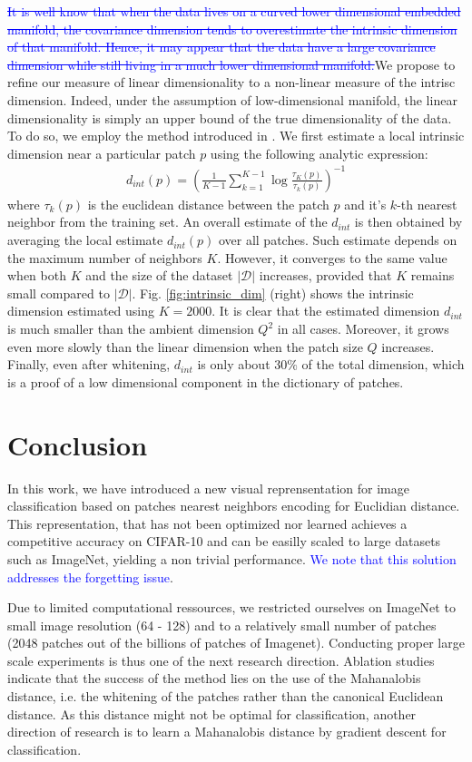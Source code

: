 \documentclass{article}
\newcommand{\Edouard}[1]{\textcolor{blue}{#1}}
\begin{document}
\Edouard{\sout{It is well know that when the data lives on a curved lower dimensional embedded manifold, the covariance dimension tends to overestimate the intrinsic dimension of that manifold. Hence, it may appear that the data have a large covariance dimension while still living in a much lower dimensional manifold.}}We propose to refine our measure of linear dimensionality to a non-linear measure of the intrisc dimension. Indeed, under the assumption of low-dimensional manifold, the linear dimensionality is simply an upper bound of the true dimensionality of the data. To do so, we employ the method introduced in \citep{}. We first estimate a local intrinsic dimension near a particular patch $p$ using the following analytic expression:
\begin{align}
	d_{int}(p) = \left( \frac{1}{K-1} \sum_{k=1}^{K-1}\log \frac{\tau_K(p)}{\tau_k(p)} \right)^{-1} 
\end{align}
where $\tau_k(p)$ is the euclidean distance between the patch $p$ and it's $k$-th nearest neighbor from the training set. 
An overall estimate of the $d_{int}$ is then obtained by averaging the local estimate $d_{int}(p)$ over all patches. Such estimate depends on the maximum number of neighbors $K$. However, it converges to the same value when both $K$ and the size of the dataset $| \mathcal{D}|$ increases, provided that $K$ remains small compared to  $ |\mathcal{D}|$. Fig. \ref{fig:intrinsic_dim} (right) shows the intrinsic dimension estimated using $K=2000$. It is clear that the estimated dimension $d_{int}$ is much smaller than the ambient dimension $Q
^2$ in all cases. Moreover, it grows even more slowly than the linear dimension when the patch size $Q$ increases. Finally, even after whitening, $d_{int}$ is only about $30\%$ of the total dimension, which is a proof of a low dimensional component in the dictionary of patches.   
\section{Conclusion}

In this work, we have introduced a new visual reprensentation for image classification based on patches nearest neighbors encoding for Euclidian distance.
This representation, that has not been optimized nor learned achieves a competitive accuracy on CIFAR-10 and can be easilly scaled to large datasets such as ImageNet, yielding a non trivial performance.\Edouard{ We note that this solution addresses the forgetting issue}.


Due to limited computational ressources, we restricted ourselves on ImageNet to small image resolution (64 - 128) and to a relatively small number of patches (2048 patches out of the billions of patches of  Imagenet).
Conducting proper large scale experiments is thus one of the next research direction.
Ablation studies indicate that the success of the method lies on the use of the Mahanalobis distance, i.e. the whitening of the patches rather than the canonical Euclidean distance.
As this distance might not be optimal for classification, another direction of research is to learn a Mahanalobis distance by gradient descent for classification.
\end{document}
